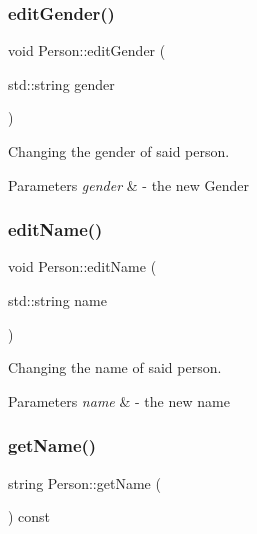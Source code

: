 \subsubsection{\texorpdfstring{edit\+Gender()}{editGender()}}
{\footnotesize\ttfamily void Person\+::edit\+Gender (\begin{DoxyParamCaption}\item[{std\+::string}]{gender }\end{DoxyParamCaption})}



Changing the gender of said person. 


\begin{DoxyParams}{Parameters}
{\em gender} & -\/ the new Gender \\
\hline
\end{DoxyParams}
\mbox{\label{class_person_ade234dfe2fb73a9ae41bac93b52c17c6}} 
\subsubsection{\texorpdfstring{edit\+Name()}{editName()}}
{\footnotesize\ttfamily void Person\+::edit\+Name (\begin{DoxyParamCaption}\item[{std\+::string}]{name }\end{DoxyParamCaption})}



Changing the name of said person. 


\begin{DoxyParams}{Parameters}
{\em name} & -\/ the new name \\
\hline
\end{DoxyParams}
\mbox{\label{class_person_a9db2e2ccfc6cfa0d7979613ec2aaa922}} 
\subsubsection{\texorpdfstring{get\+Name()}{getName()}}
{\footnotesize\ttfamily string Person\+::get\+Name (\begin{DoxyParamCaption}{ }\end{DoxyParamCaption}) const}



